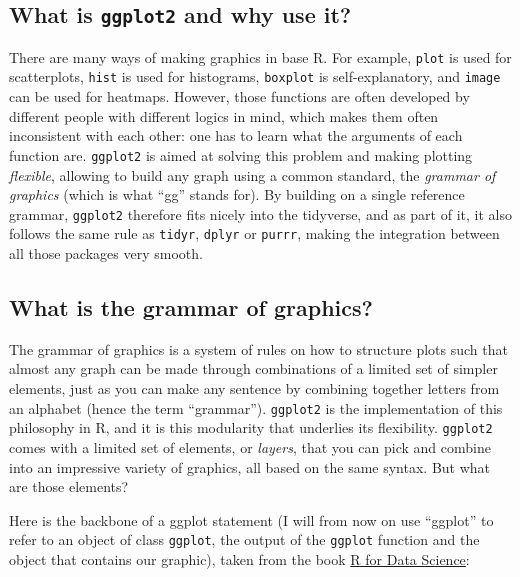 \documentclass[]{book}
\begin{document}
\hypertarget{what-is-ggplot2-and-why-use-it}{%
\subsection{\texorpdfstring{What is \texttt{ggplot2} and why use it?}{What is ggplot2 and why use it?}}\label{what-is-ggplot2-and-why-use-it}}

There are many ways of making graphics in base R. For example, \texttt{plot} is used for scatterplots, \texttt{hist} is used for histograms, \texttt{boxplot} is self-explanatory, and \texttt{image} can be used for heatmaps. However, those functions are often developed by different people with different logics in mind, which makes them often inconsistent with each other: one has to learn what the arguments of each function are. \texttt{ggplot2} is aimed at solving this problem and making plotting \emph{flexible}, allowing to build any graph using a common standard, the \emph{grammar of graphics} (which is what ``gg'' stands for). By building on a single reference grammar, \texttt{ggplot2} therefore fits nicely into the tidyverse, and as part of it, it also follows the same rule as \texttt{tidyr}, \texttt{dplyr} or \texttt{purrr}, making the integration between all those packages very smooth.

\hypertarget{what-is-the-grammar-of-graphics}{%
\subsection{What is the grammar of graphics?}\label{what-is-the-grammar-of-graphics}}

The grammar of graphics is a system of rules on how to structure plots such that almost any graph can be made through combinations of a limited set of simpler elements, just as you can make any sentence by combining together letters from an alphabet (hence the term ``grammar''). \texttt{ggplot2} is the implementation of this philosophy in R, and it is this modularity that underlies its flexibility. \texttt{ggplot2} comes with a limited set of elements, or \emph{layers}, that you can pick and combine into an impressive variety of graphics, all based on the same syntax. But what are those elements?

Here is the backbone of a ggplot statement (I will from now on use ``ggplot'' to refer to an object of class \texttt{ggplot}, the output of the \texttt{ggplot} function and the object that contains our graphic), taken from the book \href{https://r4ds.had.co.nz/}{R for Data Science}:
\end{document}
